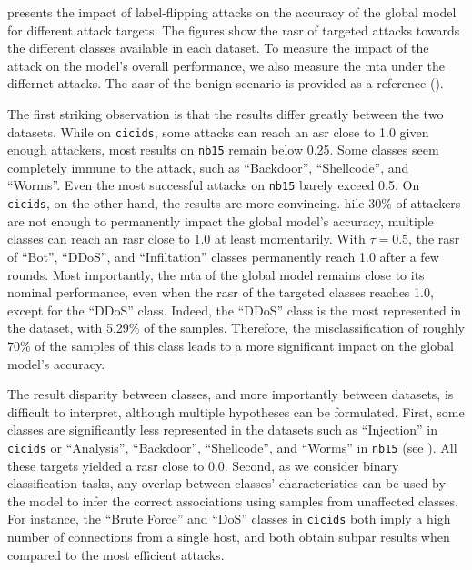  presents the impact of label-flipping attacks on the accuracy of the global model for different attack targets.
The figures show the \gls{rasr} of targeted attacks towards the different classes available in each dataset.
To measure the impact of the attack on the model's overall performance, we also measure the \gls{mta} under the differnet attacks.
The \gls{aasr} of the benign scenario is provided as a reference (\cf {}).

The first striking observation is that the results differ greatly between the two datasets.
While on \texttt{cicids}, some attacks can reach an \gls{asr} close to 1.0 given enough attackers, most results on \texttt{nb15} remain below 0.25.
Some classes seem completely immune to the attack, such as ``Backdoor'', ``Shellcode'', and ``Worms''.
Even the most successful attacks on \texttt{nb15} barely exceed 0.5.
On \texttt{cicids}, on the other hand, the results are more convincing.
hile 30\% of attackers are not enough to permanently impact the global model's accuracy, multiple classes can reach an \gls{rasr} close to 1.0 at least momentarily.
With $\tau=0.5$, the \gls{rasr} of ``Bot'', ``DDoS'', and ``Infiltation'' classes permanently reach 1.0 after a few rounds.
Most importantly, the \gls{mta} of the global model remains close to its nominal performance, even when the \gls{rasr} of the targeted classes reaches 1.0, except for the ``DDoS'' class.
Indeed, the ``DDoS'' class is the most represented in the dataset, with 5.29\% of the samples. 
Therefore, the misclassification of roughly 70\% of the samples of this class leads to a more significant impact on the global model's accuracy.

The result disparity between classes, and more importantly between datasets, is difficult to interpret, although multiple hypotheses can be formulated.
First, some classes are significantly less represented in the datasets such as ``Injection'' in \texttt{cicids} or ``Analysis'', ``Backdoor'', ``Shellcode'', and ``Worms'' in \texttt{nb15} (see ).
All these targets yielded a \gls{rasr} close to 0.0.
Second, as we consider binary classification tasks, any overlap between classes' characteristics can be used by the model to infer the correct associations using samples from unaffected classes.
For instance, the ``Brute Force'' and ``DoS'' classes in \texttt{cicids} both imply a high number of connections from a single host, and both obtain subpar results when compared to the most efficient attacks.

